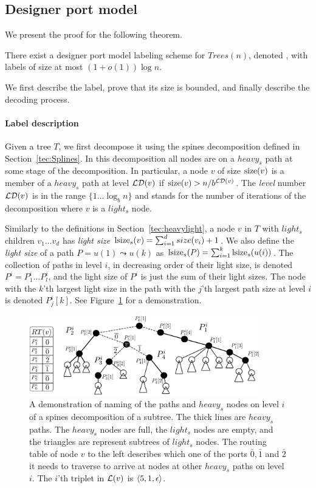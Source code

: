 \subsection{Designer port model}\label{sec:ThorupZwick}
We present the proof for the following theorem. 
\begin{theorem} \label{thm:routing-upper} \cite{Thorup01} 	
	There exist a designer port model \routing labeling scheme for $Trees(n)$, denoted  , with labels of size at most $(1+o(1)) \log n$.
\end{theorem}
We first describe the label, prove that its size is bounded, and finally describe the decoding process.

\paragraph{Label description}
Given a tree $T$, we first decompose it using the  spines decomposition defined in Section~\ref{tec:Splines}.
In this decomposition all nodes are on a  $heavy_s$ path at some stage of the decomposition.
In particular, a node $v$ of size $\operatorname{size}(v)$ is a member of a $heavy_s$ path at level $ \mathcal{LD}(v)$ if $\operatorname{size}(v)> n/b^{ \mathcal{LD}(v)}$.
The \emph{level} number $ \mathcal{LD}(v)$ is in the range $\{1 \dots \log_b n\}$ and stands for  the number of iterations of the   decomposition where  $v$ is a $light_s$ node.

Similarly to the definitions   in Section~\ref{tec:heavylight}, a  node $v$ in $T$ with  $light_s$ children $v_1 \dots v_d$ has \emph{light size} $\operatorname{lsize}_s(v) = \sum_{i=1}^{d} size(v_i)+1$.  
We also define the \emph{light size} of a path $P = u(1) \leadsto u(k)$ as $\operatorname{lsize}_s(P) = \sum_{i=1}^{k} \operatorname{lsize}_s(u(i))$.
The collection of paths in level $i$, in decreasing order of their light size, is denoted $P^i=P^i_1 \dots P^i_l$, and the light size of $P^i$ is just the sum of their light sizes. 
The  node with the $k$'th largest light size in the path with the  $j$'th largest path size at level  $i$ is denoted $P^i_j[k]$.
See Figure~\ref{fig:routing-crazy} for a demonstration.

					\begin{figure}[!ht] 
				\centering
				\includegraphics[width=100mm]{./Figures/Crazyrouting.pdf}
				\caption{A demonstration of naming of the  paths and $heavy_s$ nodes on level $i$ of a spines decomposition of a  subtree. 
				The thick lines are $heavy_s$ paths. The $heavy_s$ nodes are full, the $light_s$ nodes are empty, and the triangles are represent  subtrees of $light_s$ nodes.  The routing table of node $v$ to the left describes which one of the ports $\bar{0},\bar{1}$ and $\bar{2}$ it needs to traverse to arrive at nodes at other $heavy_s$ paths on level $i$. The $i$'th triplet in $ \mathcal{L}(v)$ is $\left \langle 5,1,\epsilon \right \rangle $.}
				\label{fig:routing-crazy}
			\end{figure}
			


